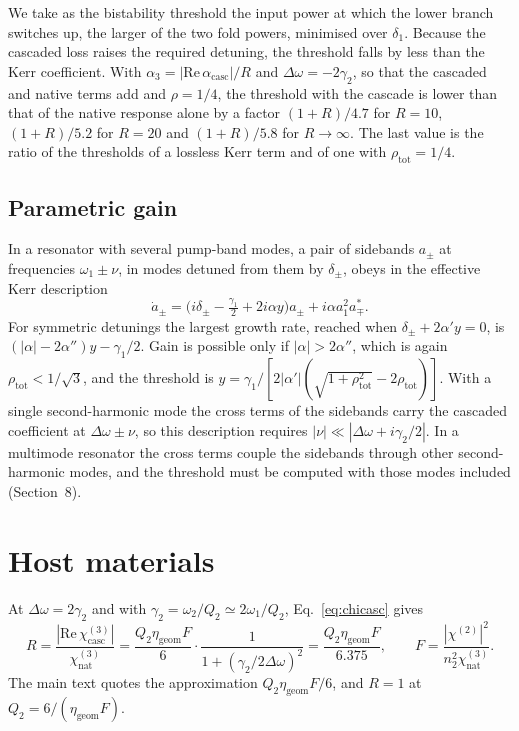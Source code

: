 \documentclass[9pt]{osa-supplemental-document}
\newcommand{\chitwo}{\chi^{(2)}}
\newcommand{\chicasc}{\chi^{(3)}_{\mathrm{casc}}}
\newcommand{\chinat}{\chi^{(3)}_{\mathrm{nat}}}
\newcommand{\Dom}{\Delta\omega}
\newcommand{\etag}{\eta_{\mathrm{geom}}}
\newcommand{\acasc}{\alpha_{\mathrm{casc}}}
\begin{document}
We take as the bistability threshold the input power at which the lower
branch switches up, the larger of the two fold powers, minimised over
$\delta_1$.  Because the cascaded loss raises the required detuning, the
threshold falls by less than the Kerr coefficient.  With
$\alpha_3=|\mathrm{Re}\,\acasc|/R$ and $\Dom=-2\gamma_2$, so that the
cascaded and native terms add and $\rho=1/4$, the threshold with the
cascade is lower than that of the native response alone by a factor
$(1+R)/4.7$ for
$R=10$, $(1+R)/5.2$ for $R=20$ and $(1+R)/5.8$ for $R\to\infty$.  The last
value is the ratio of the thresholds of a lossless Kerr term and of one
with $\rho_{\mathrm{tot}}=1/4$.

\subsection{Parametric gain}

In a resonator with several pump-band modes, a pair of sidebands $a_\pm$
at frequencies $\omega_1\pm\nu$, in modes detuned from them by
$\delta_\pm$, obeys in the effective Kerr description
\begin{equation}
  \dot a_\pm=\bigl(i\delta_\pm-\tfrac{\gamma_1}{2}+2i\alpha y\bigr)a_\pm
  +i\alpha a_1^2a_\mp^* .
\end{equation}
For symmetric detunings the largest growth rate, reached when
$\delta_\pm+2\alpha'y=0$, is $(|\alpha|-2\alpha'')y-\gamma_1/2$.  Gain is
possible only if $|\alpha|>2\alpha''$, which is again
$\rho_{\mathrm{tot}}<1/\sqrt3$, and the threshold is
$y=\gamma_1/[2|\alpha'|(\sqrt{1+\rho_{\mathrm{tot}}^2}-2\rho_{\mathrm{tot}})]$.
With a single second-harmonic mode the cross terms of the sidebands carry
the cascaded coefficient at $\Dom\pm\nu$, so this description requires
$|\nu|\ll|\Dom+i\gamma_2/2|$.  In a multimode resonator the cross terms
couple the sidebands through other second-harmonic modes, and the
threshold must be computed with those modes included (Section~8).

\section{Host materials}

At $\Dom=2\gamma_2$ and with $\gamma_2=\omega_2/Q_2\simeq2\omega_1/Q_2$,
Eq.~\eqref{eq:chicasc} gives
\begin{equation}
  R=\frac{|\mathrm{Re}\,\chicasc|}{\chinat}
  =\frac{Q_2\etag F}{6}\cdot\frac{1}{1+(\gamma_2/2\Dom)^2}
  =\frac{Q_2\etag F}{6.375},\qquad F=\frac{|\chitwo|^2}{n_2^2\chinat}.
\end{equation}
The main text quotes the approximation $Q_2\etag F/6$, and $R=1$ at
$Q_2=6/(\etag F)$.
\end{document}
